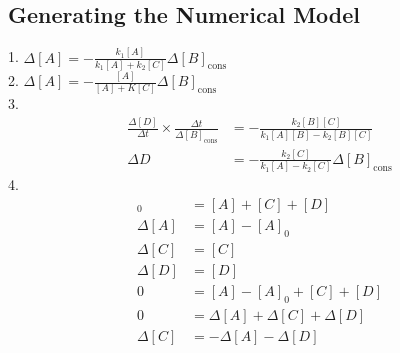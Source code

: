 \documentclass[twoside, 11pt]{article}
\begin{document}
\subsection{Generating the Numerical Model}
\begin{multicols}{2}
1. $\Delta[A] = -\frac{k_1[A]}{k_1[A] + k_2[C]}\Delta[B]_\text{cons}$\\
2. $\Delta[A] = -\frac{[A]}{[A]+K[C]}\Delta[B]_\text{cons}$\\
3. 
\begin{align*}
    \frac{\Delta[D]}{\Delta{t}}\times\frac{\Delta{t}}{\Delta[B]_\text{cons}} &= -\frac{k_2[B][C]}{k_1[A][B] - k_2[B][C]}\\
    \Delta{D} &= -\frac{k_2[C]}{k_1[A]-k_2[C]}\Delta[B]_\text{cons}
\end{align*}
4.
\begin{align*}
    [A]_0 &= [A] + [C] + [D]\\
    \Delta[A] &= [A] - [A]_0\\
    \Delta[C] &= [C]\\
    \Delta[D] &= [D]\\
    0 &= [A] - [A]_0 + [C] + [D]\\
    0 &= \Delta[A] + \Delta[C] + \Delta[D]\\
    \Delta[C] &= -\Delta[A] - \Delta[D]
\end{align*}
\end{multicols}
\end{document}
